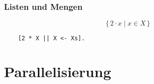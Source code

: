 \documentclass[compress]{beamer}
\begin{document}
\begin{frame}[fragile]
  \frametitle{Listen und Mengen}
  $$ \{\,2 \cdot x \mid x \in X\,\}$$

  \vfill

  \begin{lstlisting}
    [2 * X || X <- Xs].
  \end{lstlisting}
\end{frame}
\section{Parallelisierung}
\label{sec:parallelisierung}

\end{document}
